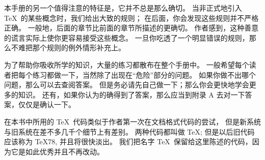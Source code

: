 {%
本手册的另一个值得注意的特征是，它并不总是那么确切。%
当非正式地引入 \TeX\ 的某些概念时，我们给出大致的规则；%
在后面，你会发现这些规则并不严格正确。%
一般地，后面的章节比前面的章节所描述的更确切。%
作者感到，这种善意的谎言实际上使你更容易接受这些概念。%
一旦你吃透了一个明显错误的规则，那么不难把那个规则的例外情形补充上。

为了帮助你吸收所学的知识，大量的练习都散布在整个手册中。%
一般希望每个读者把每个练习都做一下，当然除了出现在``危险''部分的问题。%
如果你做不出哪个问题，那么可以去查阅\hbox{答案。}%
但是务必请先自己做一下；那么你会更快地学会更多的知识。%
还有，如果你认为的确得到了答案，那么应当到附录 A 去对一下答案，仅仅是确认一下。

在本书中所用的 \TeX\ 代码类似于作者第一次在文档格式代码的尝试，%
但是新系统与旧系统在差不多几千个细节上有差别。%
两种代码都叫做 \TeX; 但是以后旧代码应该称为 \TeX78, 并且将很快淡出。%
我们把名字 \TeX\ 保留给这里陈述的代码，因为它是如此优秀并且不再改动。

}
